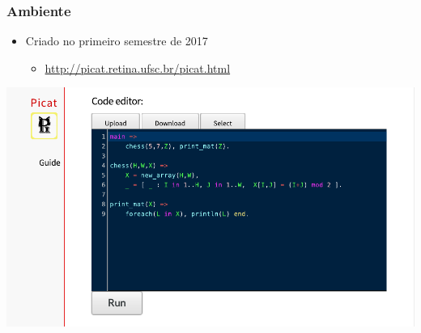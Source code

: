 \documentclass[brazil]{beamer}
\begin{document}
\begin{frame}

    \frametitle{Ambiente}

    \begin{itemize}
      \item Criado no primeiro semestre de 2017 \\
      \begin{itemize}
        \item \url{http://picat.retina.ufsc.br/picat.html}
      \end{itemize}

    \end{itemize}

\begin{center}
\includegraphics[width=.8\textwidth]{figures/ambiente.pdf}
\end{center}

\end{frame}
\end{document}
